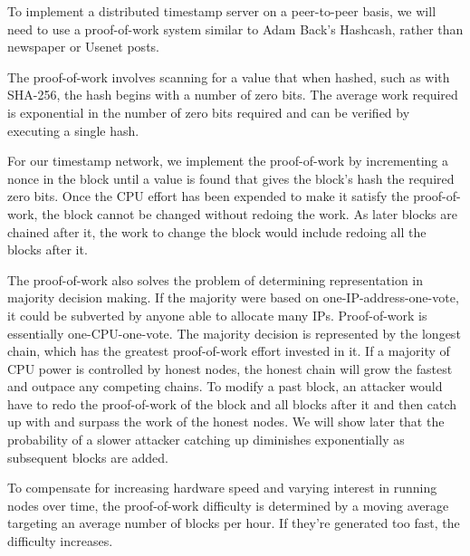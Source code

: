 To implement a distributed timestamp server on a peer-to-peer basis, we will need to use a proof-of-work system similar to Adam Back's Hashcash, rather than newspaper or Usenet posts.

The proof-of-work involves scanning for a value that when hashed, such as with SHA-256, the hash begins with a number of zero bits. The average work required is exponential in the number of zero bits required and can be verified by executing a single hash.

For our timestamp network, we implement the proof-of-work by incrementing a nonce in the block until a value is found that gives the block's hash the required zero bits. Once the CPU effort has been expended to make it satisfy the proof-of-work, the block cannot be changed without redoing the work. As later blocks are chained after it, the work to change the block would include redoing all the blocks after it.

The proof-of-work also solves the problem of determining representation in majority decision making. If the majority were based on one-IP-address-one-vote, it could be subverted by anyone able to allocate many IPs. Proof-of-work is essentially one-CPU-one-vote. The majority decision is represented by the longest chain, which has the greatest proof-of-work effort invested in it. If a majority of CPU power is controlled by honest nodes, the honest chain will grow the fastest and outpace any competing chains. To modify a past block, an attacker would have to redo the proof-of-work of the block and all blocks after it and then catch up with and surpass the work of the honest nodes. We will show later that the probability of a slower attacker catching up diminishes exponentially as subsequent blocks are added.

To compensate for increasing hardware speed and varying interest in running nodes over time, the proof-of-work difficulty is determined by a moving average targeting an average number of blocks per hour. If they're generated too fast, the difficulty increases.